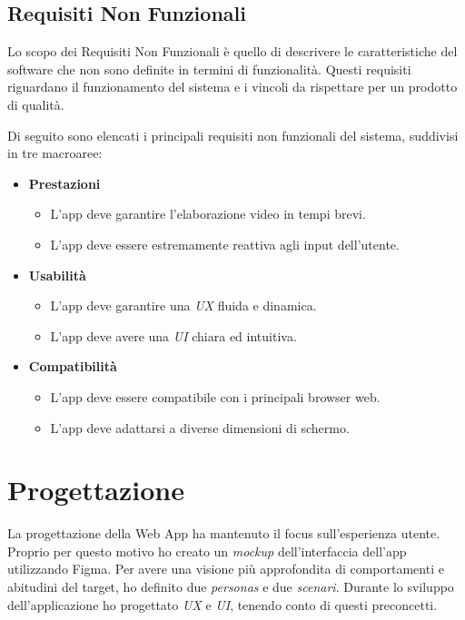 \subsection{Requisiti Non Funzionali}

Lo scopo dei Requisiti Non Funzionali è quello di descrivere le caratteristiche del software che non sono definite in termini di funzionalità. Questi requisiti riguardano il funzionamento del sistema e i vincoli da rispettare per un prodotto di qualità.

\noindent Di seguito sono elencati i principali requisiti non funzionali del sistema, suddivisi in tre macroaree:

\begin{itemize}
    \item \textbf{Prestazioni}
    \begin{itemize}
        \item L'app deve garantire l'elaborazione video in tempi brevi.
        \item L'app deve essere estremamente reattiva agli input dell'utente.
    \end{itemize}

    \item \textbf{Usabilità}
    \begin{itemize}
        \item L'app deve garantire una \textit{UX} fluida e dinamica.
        \item L'app deve avere una \textit{UI} chiara ed intuitiva. 
    \end{itemize}

    \item \textbf{Compatibilità}
    \begin{itemize}
        \item L'app deve essere compatibile con i principali browser web.
        \item L'app deve adattarsi a diverse dimensioni di schermo.
    \end{itemize}
\end{itemize}

\section{Progettazione}
\label{sec:progettazione}

La progettazione della Web App ha mantenuto il focus sull'esperienza utente. Proprio per questo motivo ho creato un \textit{mockup} dell'interfaccia dell'app utilizzando Figma. 
Per avere una visione più approfondita di comportamenti e abitudini del target, ho definito due \textit{personas} e due \textit{scenari}. Durante lo sviluppo dell'applicazione ho progettato \textit{UX} e \textit{UI}, tenendo conto di questi preconcetti. 







